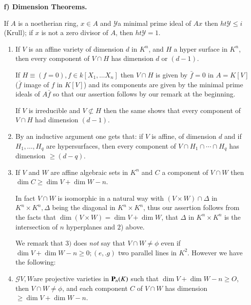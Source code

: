 \noindent \textbf{f) Dimension Theorems.}\pageoriginale

  If $A$  is a noetherian ring, $x \in A$  and $\mathscr{Y}$a minimal
  prime ideal of $Ax$ then  $ ht \mathscr{Y} \leq i$ (Krull); if $x$ is
  not a zero divisor of $A$, then $ht \mathscr{Y}=1$. 

\begin{enumerate}[1)]
  \item  If $V$ is an affine variety of  dimension $d$ in $K^n$, and
    $H$ a hyper surface in $K^n$, then every component of $V \cap H$
    has dimension  $d$ or $(d-1)$. 
 
    If $H \equiv (f=0), f \in k[X_1,\ldots X_n]$ then $V \cap H$ is
    given by $\bar{f}=0$ in $A=K[V]$ ($\bar{f}$ image of $f$ in
    $K[V]$) and its components are given by the minimal prime ideals
    of $A\bar{f}$ so that our assertion follows by our remark at the
    beginning. 
 
    If $V$ is irreducible and $V \not\subset H$ then the same shows
    that every component of $V \cap H$ had dimension $(d-1)$.  
  \item By an inductive argument one gets that: if $V$ is affine, of
    dimension $d$ and if $H_1, \ldots, H_q$ are hypersurfaces, then
    every component of $V \cap H_1 \cap \cdots  \cap H_q$ has
    dimension $\ge  (d-q)$. 
 \item If $V$ and $W$ are affine algebraic sets in $K^n$ and $C$ a
   component of $V \cap W$ then \textit{$\dim C \ge \dim V+ \dim
     W-n$}. 

   In fact $V \cap W $ is isomorphic in a natural way with $(V \times
   W )\cap \Delta $ in $K^n \times K^n,\Delta $ being the diagonal in
   $K^n \times K^n$, thus our assertion follows  from the facts that
   $\dim (V \times W) = \dim V + \dim W$, that $\Delta $ in $K^n
   \times K^n$ is the intersection of $n$ hyperplanes and $2$) above. 

   We remark  that $3)$ does \textit{not} say that $ V \cap W \neq
   \phi$ even if $\dim V + \dim W-n \ge 0; (e,.g)$ two parallel lines  
   in $K^2$. However we have the following: 
 \item $\mathscr{G} V,W$\pageoriginale are projective varieties in $\mathbf{P}_n
   (K)$ such that $\dim V+ \dim W-n \ge O$, then $V \cap W \neq \phi$,
   and each component $C$ 
   of $V \cap W $ has dimension $\ge  \dim V + \dim W-n$. 
 

\end{enumerate}
